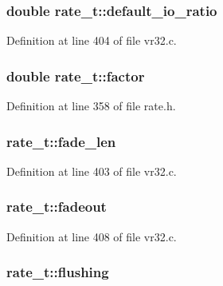 \subsubsection[{\texorpdfstring{default\+\_\+io\+\_\+ratio}{default_io_ratio}}]{\setlength{\rightskip}{0pt plus 5cm}double rate\+\_\+t\+::default\+\_\+io\+\_\+ratio}\hypertarget{structrate__t_afd9c541a319b96c473f2e0ba5b1911ce}{}\label{structrate__t_afd9c541a319b96c473f2e0ba5b1911ce}


Definition at line 404 of file vr32.\+c.

\subsubsection[{\texorpdfstring{factor}{factor}}]{\setlength{\rightskip}{0pt plus 5cm}double rate\+\_\+t\+::factor}\hypertarget{structrate__t_ad6971ee5baa6fb79dc1778617e62996c}{}\label{structrate__t_ad6971ee5baa6fb79dc1778617e62996c}


Definition at line 358 of file rate.\+h.

\subsubsection[{\texorpdfstring{fade\+\_\+len}{fade_len}}]{ rate\+\_\+t\+::fade\+\_\+len}\hypertarget{structrate__t_a2ec0e02f987765366f4817e431c8c468}{}\label{structrate__t_a2ec0e02f987765366f4817e431c8c468}


Definition at line 403 of file vr32.\+c.

\subsubsection[{\texorpdfstring{fadeout}{fadeout}}]{ rate\+\_\+t\+::fadeout}\hypertarget{structrate__t_a4aa7fd5873f75a6b6aa7222c0e977e2f}{}\label{structrate__t_a4aa7fd5873f75a6b6aa7222c0e977e2f}


Definition at line 408 of file vr32.\+c.

\subsubsection[{\texorpdfstring{flushing}{flushing}}]{ rate\+\_\+t\+::flushing}\hypertarget{structrate__t_a34c9ea2ba61108bbec6a71b68e5f592a}{}\label{structrate__t_a34c9ea2ba61108bbec6a71b68e5f592a}


